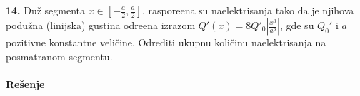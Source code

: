 \clearpage
\textbf{\Large 14.} Du\v{z} segmenta $x\in\left[-\frac{a}{2}, \frac{a}{2}\right]$, raspore\dj{}ena su naelektrisanja tako da je njihova podu\v{z}na (linijska) gustina odre\dj{}ena izrazom $Q'(x) = 8 Q'_0\left|\frac{x^3}{a^3}\right|$, gde su $Q_0'$ i $a$ pozitivne konstantne veli\v{c}ine. Odrediti ukupnu koli\v{c}inu naelektrisanja na posmatranom segmentu.
\\\\
\textbf{\Large Re\v{s}enje}\\
